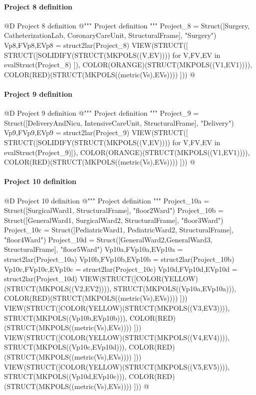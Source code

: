\documentclass[11pt,oneside]{article}    %
\begin{document}
\paragraph{Project 8 definition}
@D Project 8 definition
@{""" Project definition """
Project_8 = Struct([Surgery, CatheterizationLab, CoronaryCareUnit, StructuralFrame], 
					"Surgery")
Vp8,FVp8,EVp8 = struct2lar(Project_8)
VIEW(STRUCT([ STRUCT([SOLIDIFY(STRUCT(MKPOLS((V,EV)))) for V,FV,EV in evalStruct(Project_8) ]), 
	COLOR(ORANGE)(STRUCT(MKPOLS((V1,EV1)))), COLOR(RED)(STRUCT(MKPOLS((metric(Vs),EVs)))) ]))
@}

\paragraph{Project 9 definition}
@D Project 9 definition
@{""" Project definition """
Project_9 = Struct([DeliveryAndNicu, IntensiveCareUnit, StructuralFrame], "Delivery")
Vp9,FVp9,EVp9 = struct2lar(Project_9)
VIEW(STRUCT([ STRUCT([SOLIDIFY(STRUCT(MKPOLS((V,EV)))) for V,FV,EV in evalStruct(Project_9)]), 
	COLOR(ORANGE)(STRUCT(MKPOLS((V1,EV1)))), COLOR(RED)(STRUCT(MKPOLS((metric(Vs),EVs)))) ]))
@}


\paragraph{Project 10 definition}
@D Project 10 definition
@{""" Project definition """
Project_10a = Struct([SurgicalWard1, StructuralFrame], "floor2Ward")
Project_10b = Struct([GeneralWard1, SurgicalWard2, StructuralFrame], "floor3Ward")
Project_10c = Struct([PediatricWard1, PediatricWard2, StructuralFrame], "floor4Ward")
Project_10d = Struct([GeneralWard2,GeneralWard3, StructuralFrame], "floor5Ward")
Vp10a,FVp10a,EVp10a = struct2lar(Project_10a)
Vp10b,FVp10b,EVp10b = struct2lar(Project_10b)
Vp10c,FVp10c,EVp10c = struct2lar(Project_10c)
Vp10d,FVp10d,EVp10d = struct2lar(Project_10d)
VIEW(STRUCT([COLOR(YELLOW)(STRUCT(MKPOLS((V2,EV2)))), STRUCT(MKPOLS((Vp10a,EVp10a))),
COLOR(RED)(STRUCT(MKPOLS((metric(Vs),EVs)))) ]))
VIEW(STRUCT([COLOR(YELLOW)(STRUCT(MKPOLS((V3,EV3)))), STRUCT(MKPOLS((Vp10b,EVp10b))),
COLOR(RED)(STRUCT(MKPOLS((metric(Vs),EVs)))) ]))
VIEW(STRUCT([COLOR(YELLOW)(STRUCT(MKPOLS((V4,EV4)))), STRUCT(MKPOLS((Vp10c,EVp10d))),
COLOR(RED)(STRUCT(MKPOLS((metric(Vs),EVs)))) ]))
VIEW(STRUCT([COLOR(YELLOW)(STRUCT(MKPOLS((V5,EV5)))), STRUCT(MKPOLS((Vp10d,EVp10c))),
COLOR(RED)(STRUCT(MKPOLS((metric(Vs),EVs)))) ]))
@}
\end{document}
